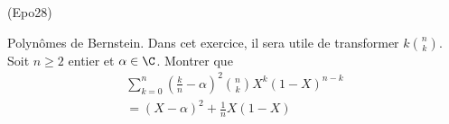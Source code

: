 \begin{tiny}(Epo28)\end{tiny} Polynômes de Bernstein.\newline
Dans cet exercice, il sera utile de transformer $k\binom{n}{k}$.\newline
Soit $n\geq 2$ entier et $\alpha\in \C$.\newline
Montrer que
\begin{multline*}
 \sum_{k=0}^n\left( \frac{k}{n}-\alpha \right)^2 \binom{n}{k}X^k(1-X)^{n-k} \\
= (X-\alpha)^2 + \frac{1}{n}X(1-X) 
\end{multline*}
 
